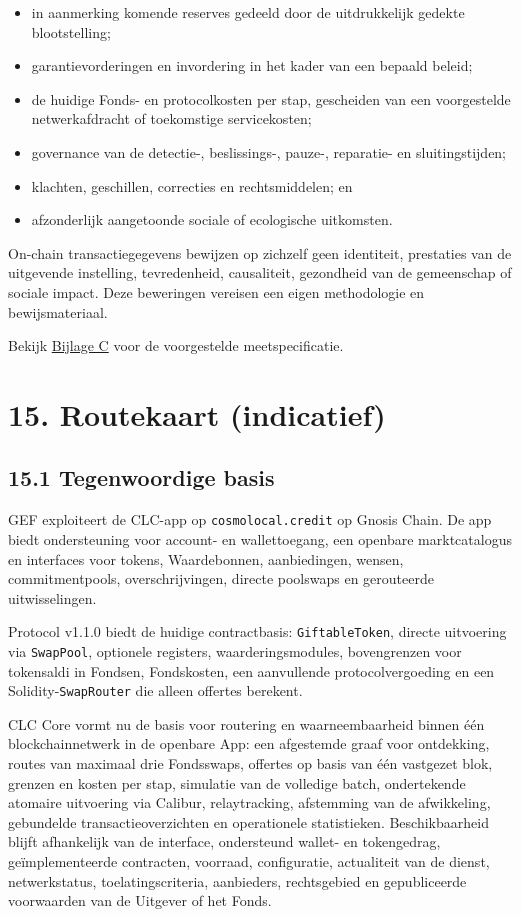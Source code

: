 \documentclass[11pt]{article}
\begin{document}
\begin{itemize}[leftmargin=*]
\item in aanmerking komende reserves gedeeld door de uitdrukkelijk gedekte blootstelling;
\item garantievorderingen en invordering in het kader van een bepaald beleid;
\item de huidige Fonds- en protocolkosten per stap, gescheiden van een voorgestelde netwerkafdracht of toekomstige servicekosten;
\item governance van de detectie-, beslissings-, pauze-, reparatie- en sluitingstijden;
\item klachten, geschillen, correcties en rechtsmiddelen; en
\item afzonderlijk aangetoonde sociale of ecologische uitkomsten.
\end{itemize}
On-chain transactiegegevens bewijzen op zichzelf geen identiteit, prestaties van de uitgevende instelling, tevredenheid, causaliteit, gezondheid van de gemeenschap of sociale impact. Deze beweringen vereisen een eigen methodologie en bewijsmateriaal.

Bekijk \href{https://docs.cosmolocal.credit/nl-BE/white-paper/appendix-c-kpi-definitions}{Bijlage C} voor de voorgestelde meetspecificatie.


\section*{15. Routekaart (indicatief)}

\subsection*{15.1 Tegenwoordige basis}

GEF exploiteert de CLC-app op \texttt{cosmolocal.credit} op Gnosis Chain. De app biedt ondersteuning voor account- en wallettoegang, een openbare marktcatalogus en interfaces voor tokens, Waardebonnen, aanbiedingen, wensen, commitmentpools, overschrijvingen, directe poolswaps en gerouteerde uitwisselingen.

Protocol v1.1.0 biedt de huidige contractbasis: \texttt{GiftableToken}, directe uitvoering via \texttt{SwapPool}, optionele registers, waarderingsmodules, bovengrenzen voor tokensaldi in Fondsen, Fondskosten, een aanvullende protocolvergoeding en een Solidity-\texttt{SwapRouter} die alleen offertes berekent.

CLC Core vormt nu de basis voor routering en waarneembaarheid binnen één blockchainnetwerk in de openbare App: een afgestemde graaf voor ontdekking, routes van maximaal drie Fondsswaps, offertes op basis van één vastgezet blok, grenzen en kosten per stap, simulatie van de volledige batch, ondertekende atomaire uitvoering via Calibur, relaytracking, afstemming van de afwikkeling, gebundelde transactieoverzichten en operationele statistieken. Beschikbaarheid blijft afhankelijk van de interface, ondersteund wallet- en tokengedrag, geïmplementeerde contracten, voorraad, configuratie, actualiteit van de dienst, netwerkstatus, toelatingscriteria, aanbieders, rechtsgebied en gepubliceerde voorwaarden van de Uitgever of het Fonds.
\end{document}
